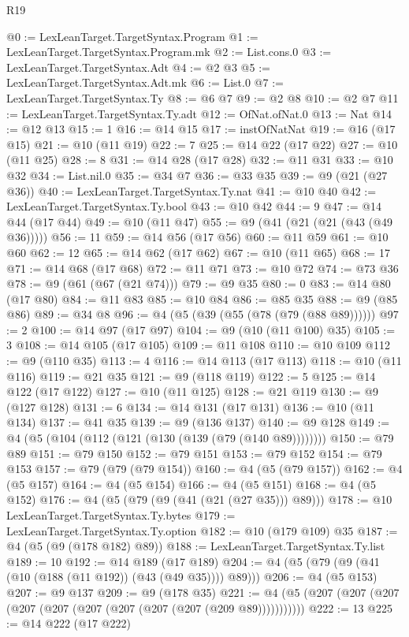 \begin{lexlean}{R19}
\begin{coremodule}
@0 := LexLeanTarget.TargetSyntax.Program
@1 := LexLeanTarget.TargetSyntax.Program.mk
@2 := List.cons.{0}
@3 := LexLeanTarget.TargetSyntax.Adt
@4 := @2 @3
@5 := LexLeanTarget.TargetSyntax.Adt.mk
@6 := List.{0}
@7 := LexLeanTarget.TargetSyntax.Ty
@8 := @6 @7
@9 := @2 @8
@10 := @2 @7
@11 := LexLeanTarget.TargetSyntax.Ty.adt
@12 := OfNat.ofNat.{0}
@13 := Nat
@14 := @12 @13
@15 := 1
@16 := @14 @15
@17 := instOfNatNat
@19 := @16 (@17 @15)
@21 := @10 (@11 @19)
@22 := 7
@25 := @14 @22 (@17 @22)
@27 := @10 (@11 @25)
@28 := 8
@31 := @14 @28 (@17 @28)
@32 := @11 @31
@33 := @10 @32
@34 := List.nil.{0}
@35 := @34 @7
@36 := @33 @35
@39 := @9 (@21 (@27 @36))
@40 := LexLeanTarget.TargetSyntax.Ty.nat
@41 := @10 @40
@42 := LexLeanTarget.TargetSyntax.Ty.bool
@43 := @10 @42
@44 := 9
@47 := @14 @44 (@17 @44)
@49 := @10 (@11 @47)
@55 := @9 (@41 (@21 (@21 (@43 (@49 @36)))))
@56 := 11
@59 := @14 @56 (@17 @56)
@60 := @11 @59
@61 := @10 @60
@62 := 12
@65 := @14 @62 (@17 @62)
@67 := @10 (@11 @65)
@68 := 17
@71 := @14 @68 (@17 @68)
@72 := @11 @71
@73 := @10 @72
@74 := @73 @36
@78 := @9 (@61 (@67 (@21 @74)))
@79 := @9 @35
@80 := 0
@83 := @14 @80 (@17 @80)
@84 := @11 @83
@85 := @10 @84
@86 := @85 @35
@88 := @9 (@85 @86)
@89 := @34 @8
@96 := @4 (@5 (@39 (@55 (@78 (@79 (@88 @89))))))
@97 := 2
@100 := @14 @97 (@17 @97)
@104 := @9 (@10 (@11 @100) @35)
@105 := 3
@108 := @14 @105 (@17 @105)
@109 := @11 @108
@110 := @10 @109
@112 := @9 (@110 @35)
@113 := 4
@116 := @14 @113 (@17 @113)
@118 := @10 (@11 @116)
@119 := @21 @35
@121 := @9 (@118 @119)
@122 := 5
@125 := @14 @122 (@17 @122)
@127 := @10 (@11 @125)
@128 := @21 @119
@130 := @9 (@127 @128)
@131 := 6
@134 := @14 @131 (@17 @131)
@136 := @10 (@11 @134)
@137 := @41 @35
@139 := @9 (@136 @137)
@140 := @9 @128
@149 := @4 (@5 (@104 (@112 (@121 (@130 (@139 (@79 (@140 @89))))))))
@150 := @79 @89
@151 := @79 @150
@152 := @79 @151
@153 := @79 @152
@154 := @79 @153
@157 := @79 (@79 (@79 @154))
@160 := @4 (@5 (@79 @157))
@162 := @4 (@5 @157)
@164 := @4 (@5 @154)
@166 := @4 (@5 @151)
@168 := @4 (@5 @152)
@176 := @4 (@5 (@79 (@9 (@41 (@21 (@27 @35))) @89)))
@178 := @10 LexLeanTarget.TargetSyntax.Ty.bytes
@179 := LexLeanTarget.TargetSyntax.Ty.option
@182 := @10 (@179 @109) @35
@187 := @4 (@5 (@9 (@178 @182) @89))
@188 := LexLeanTarget.TargetSyntax.Ty.list
@189 := 10
@192 := @14 @189 (@17 @189)
@204 := @4 (@5 (@79 (@9 (@41 (@10 (@188 (@11 @192)) (@43 (@49 @35)))) @89)))
@206 := @4 (@5 @153)
@207 := @9 @137
@209 := @9 (@178 @35)
@221 := @4 (@5 (@207 (@207 (@207 (@207 (@207 (@207 (@207 (@207 (@207 (@209 @89)))))))))))
@222 := 13
@225 := @14 @222 (@17 @222)

\end{coremodule}
\end{lexlean}
